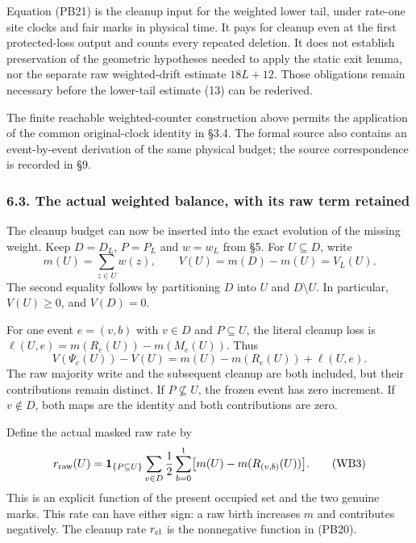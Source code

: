 \documentclass[
  11pt,
  a4paper,
]{article}
\begin{document}
Equation (PB21) is the cleanup input for the weighted lower tail, under
rate-one site clocks and fair marks in physical time. It pays for
cleanup even at the first protected-loss output and counts every
repeated deletion. It does not establish preservation of the geometric
hypotheses needed to apply the static exit lemma, nor the separate raw
weighted-drift estimate \(18L+12\). Those obligations remain necessary
before the lower-tail estimate (13) can be rederived.

The finite reachable weighted-counter construction above permits the
application of the common original-clock identity in §3.4. The formal
source also contains an event-by-event derivation of the same physical
budget; the source correspondence is recorded in §9.

\subsubsection{6.3. The actual weighted balance, with its raw term
retained}\label{the-actual-weighted-balance-with-its-raw-term-retained}

The cleanup budget can now be inserted into the exact evolution of the
missing weight. Keep \(D=D_L\), \(P=P_L\) and \(w=w_L\) from §5. For
\(U\subseteq D\), write \[
m(U)=\sum_{z\in U}w(z),\qquad
V(U)=m(D)-m(U)=V_L(U).
\tag{WB1}
\] The second equality follows by partitioning \(D\) into \(U\) and
\(D\setminus U\). In particular, \(V(U)\geq0\), and \(V(D)=0\).

For one event \(e=(v,b)\) with \(v\in D\) and \(P\subseteq U\), the
literal cleanup loss is \(\ell(U,e)=m(R_e(U))-m(M_e(U))\). Thus \[
V(\Psi_e(U))-V(U)
=m(U)-m(R_e(U))+\ell(U,e).
\tag{WB2}
\] The raw majority write and the subsequent cleanup are both included,
but their contributions remain distinct. If \(P\not\subseteq U\), the
frozen event has zero increment. If \(v\notin D\), both maps are the
identity and both contributions are zero.

Define the actual masked raw rate by \[
r_{\rm raw}(U)=\mathbf1_{\{P\subseteq U\}}
\sum_{v\in D}\frac12\sum_{b=0}^1
\bigl[m(U)-m(R_{(v,b)}(U))\bigr].
\tag{WB3}
\] This is an explicit function of the present occupied set and the two
genuine marks. This rate can have either sign: a raw birth increases
\(m\) and contributes negatively. The cleanup rate \(r_{\rm cl}\) is the
nonnegative function in (PB20).
\end{document}
